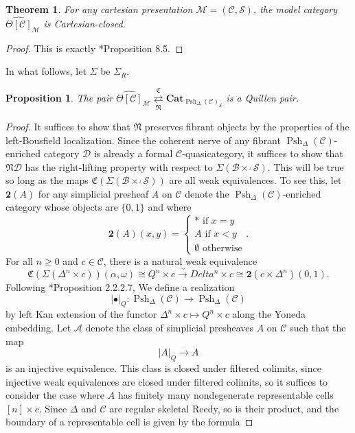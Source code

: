 \documentclass{amsart}
\numberwithin{equation}{section}
\theoremstyle{plain}   %
\newtheorem{thm}[subsection]{Theorem}
\newtheorem{prop}[subsection]{Proposition}
\theoremstyle{remark}
\theoremstyle{plain}
\DeclareMathOperator{\Psh}{Psh}
\newcommand{\Cat}{\ensuremath{\mathbf{Cat}}}
\newcommand{\realiz}[1]{\ensuremath{\left\lvert#1\right\rvert}}
\newcommand{\C}{\ensuremath{\mathcal{C}}}
\newcommand{\M}{\ensuremath{\mathcal{M}}}
\newcommand{\setS}{\ensuremath{\mathscr{S}}}
\newcommand{\cellset}{\ensuremath{\widehat{\Theta[\mathcal{C}]}}}
\begin{document}
\begin{thm} For any cartesian presentation \(\M=(\C,\setS)\), the model category \(\cellset_{\M}\) is Cartesian-closed.  
\end{thm}
\begin{proof}
  This is exactly \cite{rezk-theta-n-spaces}*{Proposition 8.5}.
\end{proof}

In what follows, let \(\Sigma\) be \(\Sigma_R\).  

\begin{prop} The pair \(\cellset_\M \underset{\mathfrak{N}}{\overset{\mathfrak{C}}{\rightleftarrows}} \Cat_{\Psh_{\Delta}(\C)_{\setS}}\) is a Quillen pair.
\end{prop}
\begin{proof}
  It suffices to show that \(\mathfrak{N}\) preserves fibrant objects by the properties of the left-Bousfield localization.  Since the coherent nerve of any fibrant \(\Psh_\Delta(\C)\)-enriched category \(\mathcal{D}\) is already a formal \(\C\)-quasicategory, it suffices to show that \(\mathfrak{N}\mathcal{D}\) has the right-lifting property with respect to \(\Sigma(\mathscr{B}\times^\lrcorner \setS)\).  This will be true so long as the maps \(\mathfrak{C}(\Sigma(\mathscr{B}\times^\lrcorner \setS))\) are all weak equivalences.  To see this, let \(\mathbf{2}(A)\) for any simplicial presheaf \(A\) on \(\C\) denote the \(\Psh_\Delta(\C)\)-enriched category whose objects are \(\{0,1\}\) and where 
  \[
    \mathbf{2}(A)(x,y)=
    \begin{cases}
      \ast \text{ if } x=y\\
      A \text{ if } x<y\\
      \emptyset \text{ otherwise}
    \end{cases}. 
  \]
  For all \(n \geq 0\) and \(c \in \C\), there is a natural weak equivalence 
  \[\mathfrak{C}(\Sigma(\Delta^n \times c))(\alpha,\omega) \cong Q^n \times c \xrightarrow{\sim} Delta^n \times c \cong \mathbf{2}(c\times \Delta^n)(0,1).\] 
  Following \cite{htt}*{Proposition 2.2.2.7}, We define a realization 
  \[\realiz{\bullet}_{Q}:\Psh_\Delta(\C)\to \Psh_\Delta(\C)\] 
  by left Kan extension of the functor \(\Delta^n\times c \mapsto Q^n \times c\) along the Yoneda embedding. Let \(\mathcal{A}\) denote the class of simplicial presheaves \(A\) on \(\C\) such that the map
  \[\realiz{A}_Q \to A\]
  is an injective equivalence.  This class is closed under filtered colimits, since injective weak equivalences are closed under filtered colimits, so it suffices to consider the case where \(A\) has finitely many nondegenerate representable cells \([n] \times c\).  Since \(\Delta\) and \(\C\) are regular skeletal Reedy, so is their product, and the boundary of a representable cell is given by the formula 

\end{proof}
\end{document}
